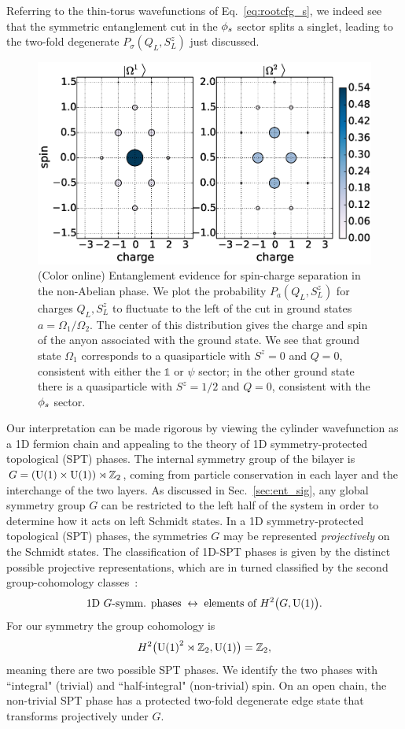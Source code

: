 Referring to the thin-torus wavefunctions of Eq.~\eqref{eq:rootcfg_s}, we indeed see that the symmetric entanglement cut in the ${\phi_s}$ sector splits a singlet, 
leading to the two-fold degenerate $P_\sigma(Q_L, S^z_L )$ just discussed.

\begin{figure}%
	\includegraphics[width=0.6\linewidth]{figures/charge_polarization.eps}
	\caption{(Color online)
		Entanglement evidence for spin-charge separation in the non-Abelian phase.
		We plot the probability $P_a(Q_L, S^z_L )$ for charges $Q_L, S^z_L $ to fluctuate to the left of the cut in ground states $a =\Omega_1 / \Omega_2$. 
		The center of this distribution gives the charge and spin of the anyon associated with the ground state. 
		We see that ground state $\Omega_1$ corresponds to a quasiparticle with $S^z=0$ and $Q = 0$, consistent with either the $\mathbb{1}$ or  $\psi$  sector; in the other ground state there is a quasiparticle with $S^z=1/2$ and $Q = 0$, consistent with the ${\phi_s}$ sector.
	}
	\label{charge}
\end{figure}

Our interpretation can be made rigorous by viewing the cylinder wavefunction  as a 1D fermion chain and appealing to the theory of 1D symmetry-protected topological (SPT) phases.
The internal symmetry group of the bilayer is $G = (\mathrm{U(1)} \times \mathrm{U(1)}) \rtimes \mathbb{Z}_2$, coming from particle conservation in each layer and the interchange of the two layers. 
As discussed in Sec.~\ref{sec:ent_sig},  any global symmetry group $G$ can be restricted to the left half of the system in order to determine how it acts on left Schmidt states.
In a 1D symmetry-protected topological (SPT) phases, the symmetries $G$ may be represented \emph{projectively} on the Schmidt states.
The classification of 1D-SPT phases is given by the distinct possible projective representations, which are in turned classified by the second group-cohomology classes~\cite{FidkowskiKitaev2011}:
\begin{align}
	\textrm{1D $G$-symm. phases} \;\leftrightarrow\; \textrm{elements of } H^2 \big( G, \mathrm{U(1)} \big).
\end{align}
For our symmetry the group cohomology is
\begin{align}
	H^2 \big( \mathrm{U(1)}^2 \rtimes \mathbb{Z}_2 , \mathrm{U(1)} \big) = \mathbb{Z}_2 ,
\end{align}
meaning there are two possible SPT phases.
We identify the two phases with ``integral" (trivial) and ``half-integral" (non-trivial) spin. 
On an open chain, the non-trivial SPT phase has a protected two-fold degenerate edge state that transforms projectively under $G$.

